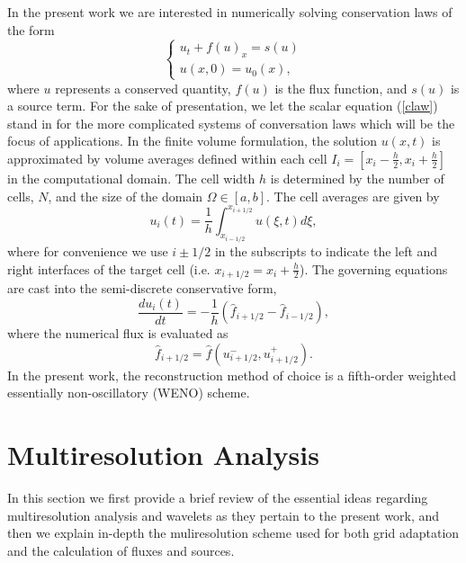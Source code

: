 \documentclass[12pt,letterpaper]{article}
\begin{document}
    In the present work we are interested in numerically solving conservation
    laws of the form
    \begin{equation}
    \begin{cases}
      u_{t} + f(u)_{x} = s(u) \\    
      u(x,0) = u_{0}(x),
    \end{cases}
    \label{claw}
    \end{equation}
    where $u$ represents a conserved quantity, $f(u)$ is the flux function, and
    $s(u)$ is a source term. For the sake of presentation, we let the scalar
    equation (\ref{claw}) stand in for the more complicated systems of
    conversation laws which will be the focus of applications.  In the finite
    volume formulation, the solution $u(x,t)$ is approximated by volume
    averages defined within each cell $I_{i} = \left[ x_{i}-\frac{h}{2},
    x_{i}+\frac{h}{2} \right]$ in the computational domain.  The cell width $h$
    is determined by the number of cells, $N$, and the size of the domain
    $\Omega \in \left[a,b\right]$.
    The cell averages are given by
    \begin{equation}
        u_{i}(t) = \frac{1}{h} \int_{x_{i-1/2}}^{x_{i+1/2}} u(\xi,t) d \xi,
    \end{equation}
    where for convenience we use $i \pm 1/2$ in the subscripts to
    indicate the left and right interfaces of the target cell (i.e.
    $x_{i+1/2} =
    x_{i} + \frac{h}{2}$). The governing equations are cast into the
    semi-discrete conservative form,
    \begin{equation}
        \frac{du_{i}(t)}{dt} = -\frac{1}{h} \left( \hat{f}_{i+1/2} -
        \hat{f}_{i-1/2} \right),
    \end{equation}
    where the numerical flux is evaluated as
    \begin{equation}
        \hat{f}_{i + 1/2} = \hat{f}(u^{-}_{i+1/2}, u^{+}_{i+1/2}).
    \end{equation}
    In the present work, the reconstruction method of choice is a fifth-order
    weighted essentially non-oscillatory (WENO) scheme.

\section{Multiresolution Analysis}

    In this section we first provide a brief review of the essential ideas
    regarding multiresolution analysis and wavelets as they pertain to the
    present work, and then we explain in-depth the muliresolution scheme used
    for both grid adaptation and the calculation of fluxes and sources.
\end{document}
